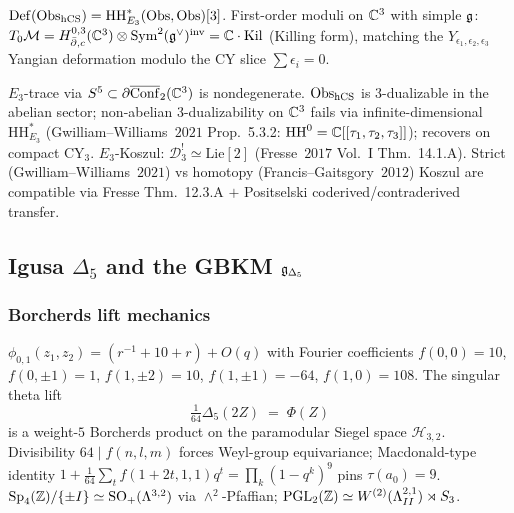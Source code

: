 \begin{theorem}\ClaimStatusTheorem
\label{wn:thm:plat-first-order-moduli}
$\mathrm{Def}(\mathrm{Obs}_{\mathrm{hCS}}) = \mathrm{HH}^*_{E_3}(\mathrm{Obs}, \mathrm{Obs})[3]$.
First-order moduli on $\mathbb{C}^3$ with simple $\mathfrak{g}$:
$T_0 \mathcal{M} = H^{0,3}_{\bar\partial, c}(\mathbb{C}^3) \otimes
\mathrm{Sym}^2(\mathfrak{g}^\vee)^{\mathrm{inv}} = \mathbb{C} \cdot \mathrm{Kil}$
(Killing form), matching the $Y_{\epsilon_1, \epsilon_2, \epsilon_3}$
Yangian deformation modulo the CY slice $\sum \epsilon_i = 0$.
\end{theorem}

\begin{theorem}\ClaimStatusTheorem
\label{wn:thm:plat-dualizability}
$E_3$-trace via $S^5 \subset \partial\overline{\mathrm{Conf}}_2(\mathbb{C}^3)$
is nondegenerate. $\mathrm{Obs}_{\mathrm{hCS}}$ is 3-dualizable in the abelian sector;
non-abelian 3-dualizability on $\mathbb{C}^3$ fails via infinite-dimensional
$\mathrm{HH}^*_{E_3}$ (Gwilliam--Williams~$2021$ Prop.~5.3.2:
$\mathrm{HH}^0 = \mathbb{C}[[\tau_1, \tau_2, \tau_3]]$); recovers on compact
CY$_3$. $E_3$-Koszul: $\mathcal{D}_3^! \simeq \mathrm{Lie}[2]$
(Fresse~$2017$ Vol.~I Thm.~14.1.A). Strict (Gwilliam--Williams~$2021$) vs
homotopy (Francis--Gaitsgory~$2012$) Koszul are compatible via
Fresse Thm.~12.3.A $+$ Positselski coderived/contraderived transfer.
\end{theorem}

\subsection{Igusa $\Delta_5$ and the GBKM $\mathfrak{g}_{\Delta_5}$}
\label{wn:subsec:plat-delta5}

\subsubsection{Borcherds lift mechanics}

\begin{theorem}\ClaimStatusTheorem
\label{wn:thm:plat-borcherds-lift}
$\phi_{0,1}(z_1, z_2) = (r^{-1} + 10 + r) + O(q)$ with
Fourier coefficients $f(0,0) = 10$, $f(0, \pm 1) = 1$, $f(1, \pm 2) = 10$,
$f(1, \pm 1) = -64$, $f(1, 0) = 108$. The singular theta lift
\[
\tfrac{1}{64}\Delta_5(2Z) \;=\; \Phi(Z)
\]
is a weight-$5$ Borcherds product on the paramodular Siegel space
$\mathcal{H}_{3,2}$. Divisibility $64 \mid f(n, l, m)$ forces
Weyl-group equivariance; Macdonald-type identity
$1 + \tfrac{1}{64}\sum_t f(1 + 2t, 1, 1) q^t = \prod_k (1 - q^k)^9$
pins $\tau(a_0) = 9$.
$\mathrm{Sp}_4(\mathbb{Z})/\{\pm I\} \simeq \mathrm{SO}_+(\Lambda^{3,2})$ via
$\wedge^2$-Pfaffian; $\mathrm{PGL}_2(\mathbb{Z}) \simeq W^{(2)}(\Lambda^{2,1}_{II})
\rtimes S_3$.
\end{theorem}

